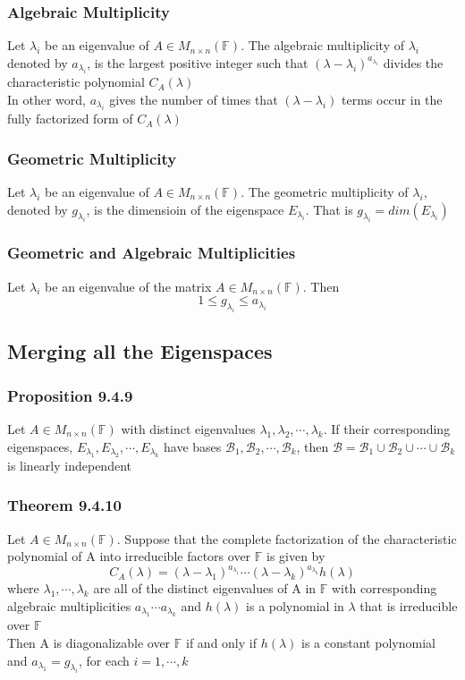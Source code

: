 \documentclass[12pt, letterpaper]{article}
\begin{document}
\subsubsection{Algebraic Multiplicity}
Let $\lambda_i$ be an eigenvalue of $A\in M_{n\times n}(\mathbb{F})$. The algebraic multiplicity of $\lambda_i$ denoted by $a_{\lambda_i}$, is the largest positive integer 
such that $(\lambda-\lambda_i)^{a_{\lambda_i}}$ divides the characteristic polynomial $C_A(\lambda)$ \\
In other word, $a_{\lambda_i}$ gives the number of times that $(\lambda-\lambda_i)$ terms occur in the fully factorized form of $C_A(\lambda)$
\subsubsection{Geometric Multiplicity}
Let $\lambda_i$ be an eigenvalue of $A\in M_{n\times n}(\mathbb{F})$. The geometric multiplicity of $\lambda_i$, denoted by $g_{\lambda_i}$, is the dimensioin
of the eigenspace $E_{\lambda_i}$. That is $g_{\lambda_i} = dim(E_{\lambda_i})$
\subsubsection{Geometric and Algebraic Multiplicities}
Let $\lambda_i$ be an eigenvalue of the matrix $A\in M_{n\times n}(\mathbb{F})$. Then 
\[1\leq g_{\lambda_i}\leq a_{\lambda_i}\]
\subsection{Merging all the Eigenspaces}
\subsubsection{Proposition 9.4.9}
Let $A\in M_{n\times n}(\mathbb{F})$ with distinct eigenvalues $\lambda_1, \lambda_2,\cdots,\lambda_k$. If their corresponding eigenspaces, 
$E_{\lambda_1}, E_{\lambda_2},\cdots, E_{\lambda_k}$ have bases $\mathcal{B}_1, \mathcal{B}_2, \cdots, \mathcal{B}_k$, then 
$\mathcal{B} = \mathcal{B}_1\cup\mathcal{B}_2\cup\cdots\cup\mathcal{B}_k$ is linearly independent 
\subsubsection{Theorem 9.4.10}
Let $A\in M_{n\times n}(\mathbb{F})$. Suppose that the complete factorization of the characteristic polynomial of A into irreducible factors over 
$\mathbb{F}$ is given by 
\[C_A(\lambda) = (\lambda-\lambda_1)^{a_{\lambda_1}}\cdots(\lambda-\lambda_k)^{a_{\lambda_k}}h(\lambda)\]
where $\lambda_1,\cdots,\lambda_k$ are all of the distinct eigenvalues of A in $\mathbb{F}$ with corresponding algebraic multiplicities $a_{\lambda_1} \cdots a_{\lambda_k}$
and $h(\lambda)$ is a polynomial in $\lambda$ that is irreducible over $\mathbb{F}$\\
Then A is diagonalizable over $\mathbb{F}$ if and only if $h(\lambda)$ is a constant polynomial and $a_{\lambda_1}=g_{\lambda_i}$, for each $i=1,\cdots,k$
\end{document}
